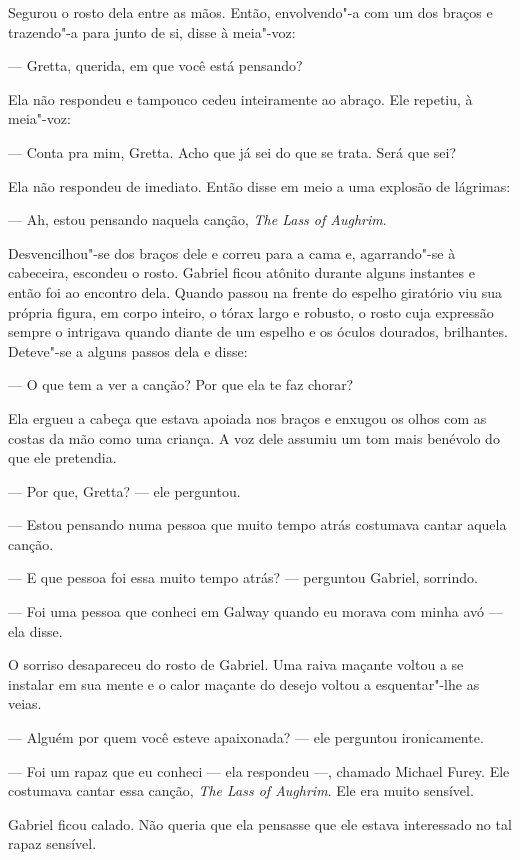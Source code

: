 Segurou o rosto dela entre as mãos.  Então, envolvendo"-a com um dos braços e
trazendo"-a para junto de si, disse à meia"-voz:

--- Gretta, querida, em que você está pensando?

Ela não respondeu e tampouco cedeu inteiramente ao abraço.  Ele repetiu, à meia"-voz:

--- Conta pra mim, Gretta.  Acho que já sei do que se trata.  Será que sei?

Ela não respondeu de imediato.  Então disse em meio a uma explosão de lágrimas:

--- Ah, estou pensando naquela canção, \textit{The Lass of Aughrim}.  

Desvencilhou"-se dos braços dele e correu para a cama e, agarrando"-se à
cabeceira, escondeu o rosto.  Gabriel ficou atônito durante alguns instantes e
então foi ao encontro dela.  Quando passou na frente do espelho giratório viu
sua própria figura, em corpo inteiro, o tórax largo e robusto, o rosto cuja
expressão sempre o intrigava quando diante de um espelho e os óculos dourados,
brilhantes.  Deteve"-se a alguns passos dela e disse:

--- O que tem a ver a canção?  Por que ela te faz chorar?

Ela ergueu a cabeça que estava apoiada nos braços e enxugou os olhos com as
costas da mão como uma criança.  A voz dele assumiu um tom mais benévolo do que
ele pretendia.

--- Por que, Gretta? --- ele perguntou.

--- Estou pensando numa pessoa que muito tempo atrás costumava cantar aquela
canção.

--- E que pessoa foi essa muito tempo atrás? --- perguntou Gabriel, sorrindo.

--- Foi uma pessoa que conheci em Galway quando eu morava com minha avó --- ela
disse.

O sorriso desapareceu do rosto de Gabriel.  Uma raiva maçante voltou a se
instalar em sua mente e o calor maçante do desejo voltou a esquentar"-lhe as
veias.

--- Alguém por quem você esteve apaixonada? --- ele perguntou ironicamente.

--- Foi um rapaz que eu conheci --- ela respondeu ---, chamado Michael Furey.
Ele costumava cantar essa canção, \textit{The Lass of Aughrim}.  Ele era muito
sensível.

Gabriel ficou calado.  Não queria que ela pensasse que ele estava interessado
no tal rapaz sensível.

